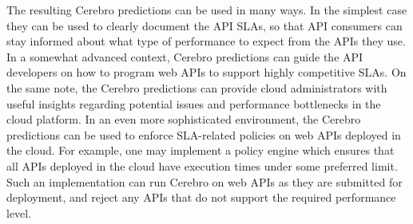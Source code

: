 The resulting Cerebro predictions can be used in many ways. In the simplest case they can be
used to clearly document the API SLAs, so that API consumers can stay informed about what 
type of performance to expect from the APIs they use. In a somewhat advanced context, Cerebro
predictions can guide the API developers on how to program web APIs to support highly competitive
SLAs. On the same note, the Cerebro predictions can provide cloud administrators with
useful insights regarding potential issues and performance bottlenecks in the cloud platform. In an
even more sophisticated environment, the Cerebro predictions can be used to enforce SLA-related
policies on web APIs deployed in the cloud. For example, one may implement a policy engine which ensures
that all APIs deployed in the cloud have execution times under some preferred limit. Such an implementation
can run Cerebro on web APIs as they are submitted for deployment, and reject any APIs that do not
support the required performance level.